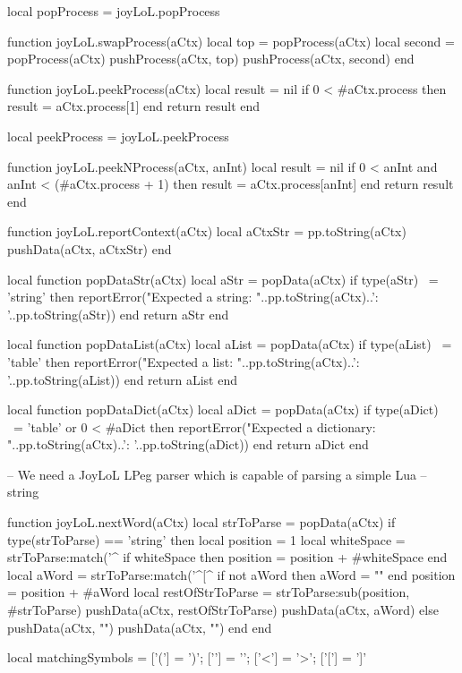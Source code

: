 local popProcess = joyLoL.popProcess

function joyLoL.swapProcess(aCtx)
  local top    = popProcess(aCtx)
  local second = popProcess(aCtx)
  pushProcess(aCtx, top)
  pushProcess(aCtx, second)
end

function joyLoL.peekProcess(aCtx)
  local result = nil
  if 0 < #aCtx.process then
    result = aCtx.process[1]
  end
  return result
end

local peekProcess = joyLoL.peekProcess

function joyLoL.peekNProcess(aCtx, anInt)
  local result = nil
  if 0 < anInt and anInt < (#aCtx.process + 1) then
    result = aCtx.process[anInt]
  end
  return result
end

function joyLoL.reportContext(aCtx)
  local aCtxStr = pp.toString(aCtx)
  pushData(aCtx, aCtxStr)
end

local function popDataStr(aCtx)
  local aStr = popData(aCtx)
  if type(aStr) ~= 'string' then
    reportError("Expected a string\naCtx: "..pp.toString(aCtx)..'\naStr: '..pp.toString(aStr))
  end
  return aStr
end

local function popDataList(aCtx)
  local aList = popData(aCtx)
  if type(aList) ~= 'table' then
    reportError("Expected a list\naCtx: "..pp.toString(aCtx)..'\naList: '..pp.toString(aList))
  end
  return aList
end

local function popDataDict(aCtx)
  local aDict = popData(aCtx)
  if type(aDict) ~= 'table' or 0 < #aDict then
    reportError("Expected a dictionary\naCtx: "..pp.toString(aCtx)..'\naDict: '..pp.toString(aDict))
  end
  return aDict
end

-- We need a JoyLoL LPeg parser which is capable of parsing a simple Lua 
-- string 

function joyLoL.nextWord(aCtx)
  local strToParse = popData(aCtx)
  if type(strToParse) == 'string' then
    local position = 1
    local whiteSpace = strToParse:match('^%
    if whiteSpace then position = position + #whiteSpace end
    local aWord = strToParse:match('^[^%
    if not aWord then aWord = "" end
    position = position + #aWord
    local restOfStrToParse = strToParse:sub(position, #strToParse)
    pushData(aCtx, restOfStrToParse)
    pushData(aCtx, aWord)
  else
    pushData(aCtx, "")
    pushData(aCtx, "")
  end
end

local matchingSymbols = {
  ['('] = ')';
  ['{'] = '}';
  ['<'] = '>';
  ['['] = ']'
}


